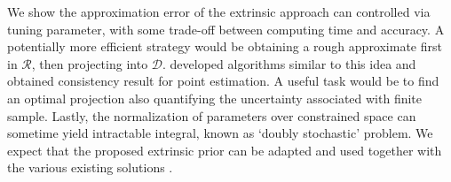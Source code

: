 \documentclass[10pt,fleqn]{article}
\newcommand{\mc}[1]{\mathcal{#1}}
\DeclareMathOperator{\1}{\mathbbm{1}}
\begin{document}
We show the approximation error of the extrinsic approach can controlled via tuning parameter, with some trade-off between computing time and accuracy. A potentially more efficient strategy would be obtaining a rough approximate first in $\mc R$, then projecting into $\mc D$. \cite{lin2016extrinsic} developed algorithms similar to this idea and obtained consistency result for point estimation. A useful task would be to find an optimal projection also quantifying the uncertainty associated with finite sample. Lastly, the normalization of parameters over constrained space can sometime yield intractable integral, known as `doubly stochastic' problem. We expect that the proposed extrinsic prior can be adapted and used together with the various existing solutions \citep{rao2016data,stoehr2017noisy}.





\end{document}
